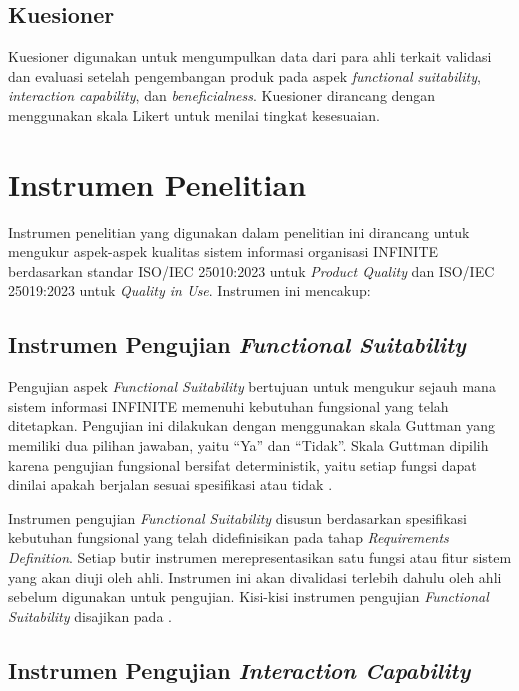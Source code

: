 \subsection{Kuesioner}

Kuesioner digunakan untuk mengumpulkan data dari para ahli terkait validasi dan evaluasi setelah pengembangan produk pada aspek \textit{functional suitability}, \textit{interaction capability}, dan \textit{beneficialness}. Kuesioner dirancang dengan menggunakan skala Likert untuk menilai tingkat kesesuaian.

\section{Instrumen Penelitian}

Instrumen penelitian yang digunakan dalam penelitian ini dirancang untuk mengukur aspek-aspek kualitas sistem informasi organisasi INFINITE berdasarkan standar ISO/IEC 25010:2023 untuk \textit{Product Quality} dan ISO/IEC 25019:2023 untuk \textit{Quality in Use}. Instrumen ini mencakup:

\subsection{Instrumen Pengujian \textit{Functional Suitability}}

Pengujian aspek \textit{Functional Suitability} bertujuan untuk mengukur sejauh mana sistem informasi INFINITE memenuhi kebutuhan fungsional yang telah ditetapkan. Pengujian ini dilakukan dengan menggunakan skala Guttman yang memiliki dua pilihan jawaban, yaitu ``Ya'' dan ``Tidak''. Skala Guttman dipilih karena pengujian fungsional bersifat deterministik, yaitu setiap fungsi dapat dinilai apakah berjalan sesuai spesifikasi atau tidak \citep{Lamada_2020_ISO25010}.

Instrumen pengujian \textit{Functional Suitability} disusun berdasarkan spesifikasi kebutuhan fungsional yang telah didefinisikan pada tahap \textit{Requirements Definition}. Setiap butir instrumen merepresentasikan satu fungsi atau fitur sistem yang akan diuji oleh ahli. Instrumen ini akan divalidasi terlebih dahulu oleh ahli sebelum digunakan untuk pengujian. Kisi-kisi instrumen pengujian \textit{Functional Suitability} disajikan pada .

\subsection{Instrumen Pengujian \textit{Interaction Capability}}


